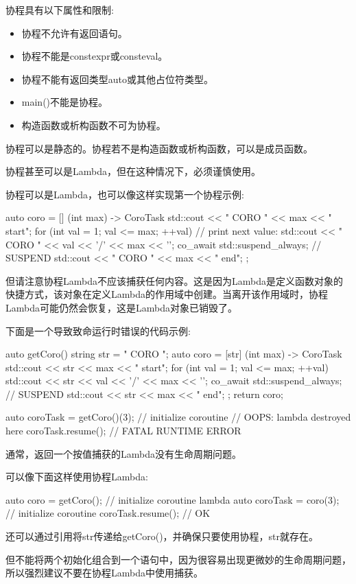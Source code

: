 
协程具有以下属性和限制:

\begin{itemize}
\item
协程不允许有返回语句。

\item
协程不能是constexpr或consteval。

\item
协程不能有返回类型auto或其他占位符类型。

\item
main()不能是协程。

\item
构造函数或析构函数不可为协程。
\end{itemize}

协程可以是静态的。协程若不是构造函数或析构函数，可以是成员函数。

协程甚至可以是Lambda，但在这种情况下，必须谨慎使用。


协程可以是Lambda，也可以像这样实现第一个协程示例:

\begin{cpp}
auto coro = [] (int max) -> CoroTask {
				std::cout << "          CORO " << max << " start\n";
				for (int val = 1; val <= max; ++val) {
					// print next value:
					std::cout << " CORO " << val << '/' << max << '\n';
					co_await std::suspend_always{}; // SUSPEND
				}
				std::cout << "         CORO " << max << " end\n";
};
\end{cpp}

但请注意协程Lambda不应该捕获任何内容。这是因为Lambda是定义函数对象的快捷方式，该对象在定义Lambda的作用域中创建。当离开该作用域时，协程Lambda可能仍然会恢复，这是Lambda对象已销毁了。

下面是一个导致致命运行时错误的代码示例:

\begin{cpp}
auto getCoro()
{
	string str = "      CORO ";
	auto coro = [str] (int max) -> CoroTask {
				std::cout << str << max << " start\n";
				for (int val = 1; val <= max; ++val) {
					std::cout << str << val << '/' << max << '\n';
					co_await std::suspend_always{}; // SUSPEND
				}
				std::cout << str << max << " end\n";
			};
	return coro;
}

auto coroTask = getCoro()(3); // initialize coroutine
// OOPS: lambda destroyed here
coroTask.resume(); // FATAL RUNTIME ERROR
\end{cpp}

通常，返回一个按值捕获的Lambda没有生命周期问题。

可以像下面这样使用协程Lambda:

\begin{cpp}
auto coro = getCoro(); // initialize coroutine lambda
auto coroTask = coro(3); // initialize coroutine
coroTask.resume(); // OK
\end{cpp}

还可以通过引用将str传递给getCoro()，并确保只要使用协程，str就存在。

但不能将两个初始化组合到一个语句中，因为很容易出现更微妙的生命周期问题，所以强烈建议不要在协程Lambda中使用捕获。

